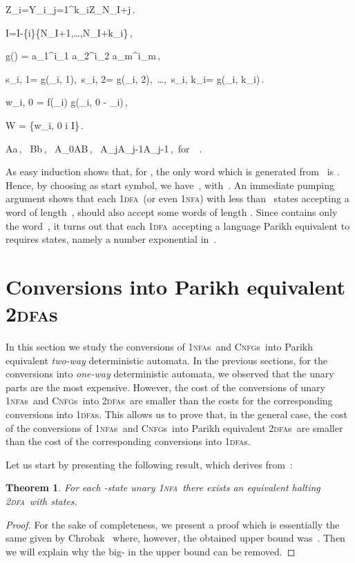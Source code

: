 \documentclass[11pt]{article}
\newcommand*{\tw}{\textsc{2}}
\newcommand*{\twdfa}{\tw\textsc{dfa}}
\newcommand*{\twdfas}{\tw\textsc{dfa}s}
\newcommand*{\ow}{\textsc{1}}
\newcommand*{\owdfa}{\ow\textsc{dfa}}
\newcommand*{\owdfas}{\ow\textsc{dfa}s}
\newcommand*{\ownfa}{\ow\textsc{nfa}}
\newcommand*{\ownfas}{\ow\textsc{nfa}s}
\newcommand*{\cnfgs}{\textsc{Cnfg}s}
\def\Vec#1{\mbox{\boldmath }}
\newtheorem{theorem}{Theorem}[section]
\begin{document}
{  Z_i=Y_i\cup\bigcup_{j=1}^{k_i}Z_{N_I+j}\,.
  
  \widehat I=I-\{i\}\cup\{N_I+1,\ldots,N_I+k_i\}\,,
  
g(\Vec{v}) = a_1^{i_1} a_2^{i_2} \cdots a_m^{i_m}\,,

s_{i, 1}= g(\Vec{v}_{i, 1}),\  s_{i, 2}= g(\Vec{v}_{i, 2}),\ \ldots,\ s_{i, k_i}= g(\Vec{v}_{i, k_i})\,.

w_{i, 0} = f(\Vec{x}_i) g(\Vec{v}_{i, 0} - \Vec{x}_i)\,,

W = \{w_{i, 0} \mid i \in I\}\,.

A\rightarrow a\,,~ B\rightarrow b\,,~ A_0\rightarrow AB\,,~ A_j\rightarrow A_{j-1}A_{j-1}\,,\mbox { for }
\,.

As easy induction shows that, for , the only word which is generated from~
is . 
Hence, by choosing  as start symbol, we have~, with~. 
An immediate pumping argument shows that each \owdfa\ (or even \ownfa) with
less than~ states accepting a word of length~, should also  accept some
words of length . Since  contains only the word~, it turns out that each 
\owdfa\ accepting a language Parikh equivalent to  requires
 states, namely a number exponential in~.



\section{Conversions into Parikh equivalent \mbox{\sc\twdfa}s}
	\label{sec:to_2DFA}


In this section we study the conversions of \ownfas\ and \cnfgs\ into Parikh equivalent
\emph{two-way} deterministic automata.
In the previous sections, for the conversions into \emph{one-way} deterministic automata,
we observed that the unary parts are the most expensive. However, the cost
of the conversions of unary \ownfas\ and \cnfgs\ into \twdfas\ are smaller than the costs for
the corresponding conversions into \owdfas. 
This allows us to prove that, in the general case, the cost of the conversions
of  \ownfas\ and \cnfgs\ into Parikh equivalent \twdfas\ are smaller
than the cost of the corresponding conversions into \owdfas.

Let us start by presenting the following result, which derives from~\cite{Chrobak1986}:

\begin{theorem}\label{thm:u1NFAto2DFA}
  For each -state unary \ownfa\ there exists an equivalent halting \twdfa\ with  states.
\end{theorem}
\begin{proof}
  For the sake of completeness, we present a proof which is essentially the same
  given by Chrobak~\cite[Thm.~6.2]{Chrobak1986} where, however,	the obtained upper bound was~. 
  Then we will explain why the big- in the upper bound can be removed.
	

\end{proof}}
\end{document}
